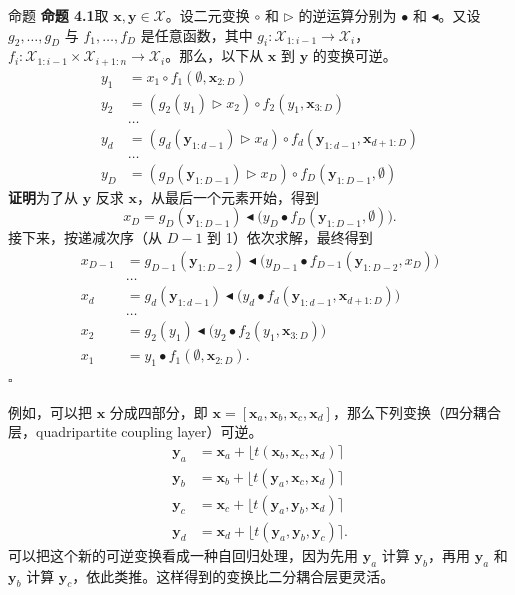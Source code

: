 \begin{booknote}{命题}
\textbf{命题 4.1}\quad 取 $\mathbf{x},\mathbf{y}\in\mathcal{X}$。设二元变换 $\circ$ 和 $\triangleright$ 的逆运算分别为 $\bullet$ 和 $\blacktriangleleft$。又设 $g_2,\ldots,g_D$ 与 $f_1,\ldots,f_D$ 是任意函数，其中 $g_i\colon\mathcal{X}_{1:i-1}\to\mathcal{X}_i$，$f_i\colon\mathcal{X}_{1:i-1}\times\mathcal{X}_{i+1:n}\to\mathcal{X}_i$。那么，以下从 $\mathbf{x}$ 到 $\mathbf{y}$ 的变换可逆。
\begin{align*}
y_1&=x_1\circ f_1(\emptyset,\mathbf{x}_{2:D})\\
y_2&=(g_2(y_1)\mathbin{\triangleright}x_2)\circ f_2(y_1,\mathbf{x}_{3:D})\\
&\ldots\\
y_d&=(g_d(\mathbf{y}_{1:d-1})\mathbin{\triangleright}x_d)
  \circ f_d(\mathbf{y}_{1:d-1},\mathbf{x}_{d+1:D})\\
&\ldots\\
y_D&=(g_D(\mathbf{y}_{1:D-1})\mathbin{\triangleright}x_D)
  \circ f_D(\mathbf{y}_{1:D-1},\emptyset)
\end{align*}
\textbf{证明}\quad 为了从 $\mathbf{y}$ 反求 $\mathbf{x}$，从最后一个元素开始，得到
\[
x_D=g_D(\mathbf{y}_{1:D-1})\mathbin{\blacktriangleleft}
\bigl(y_D\bullet f_D(\mathbf{y}_{1:D-1},\emptyset)\bigr).
\]
接下来，按递减次序（从 $D-1$ 到 1）依次求解，最终得到
\begin{align*}
x_{D-1}&=g_{D-1}(\mathbf{y}_{1:D-2})\mathbin{\blacktriangleleft}
\bigl(y_{D-1}\bullet f_{D-1}(\mathbf{y}_{1:D-2},x_D)\bigr)\\
&\ldots\\
x_d&=g_d(\mathbf{y}_{1:d-1})\mathbin{\blacktriangleleft}
\bigl(y_d\bullet f_d(\mathbf{y}_{1:d-1},\mathbf{x}_{d+1:D})\bigr)\\
&\ldots\\
x_2&=g_2(y_1)\mathbin{\blacktriangleleft}\bigl(y_2\bullet f_2(y_1,\mathbf{x}_{3:D})\bigr)\\
x_1&=y_1\bullet f_1(\emptyset,\mathbf{x}_{2:D}).
\end{align*}
\hfill$\square$
\end{booknote}

例如，可以把 $\mathbf{x}$ 分成四部分，即 $\mathbf{x}=[\mathbf{x}_a,\mathbf{x}_b,\mathbf{x}_c,\mathbf{x}_d]$，那么下列变换（四分耦合层，quadripartite coupling layer）可逆。
\begin{align}
\mathbf{y}_a&=\mathbf{x}_a+\lfloor t(\mathbf{x}_b,\mathbf{x}_c,\mathbf{x}_d)\rceil
\tag{4.37}\label{eq:04-37}\\
\mathbf{y}_b&=\mathbf{x}_b+\lfloor t(\mathbf{y}_a,\mathbf{x}_c,\mathbf{x}_d)\rceil
\tag{4.38}\label{eq:04-38}\\
\mathbf{y}_c&=\mathbf{x}_c+\lfloor t(\mathbf{y}_a,\mathbf{y}_b,\mathbf{x}_d)\rceil
\tag{4.39}\label{eq:04-39}\\
\mathbf{y}_d&=\mathbf{x}_d+\lfloor t(\mathbf{y}_a,\mathbf{y}_b,\mathbf{y}_c)\rceil.
\tag{4.40}\label{eq:04-40}
\end{align}
可以把这个新的可逆变换看成一种自回归处理，因为先用 $\mathbf{y}_a$ 计算 $\mathbf{y}_b$，再用 $\mathbf{y}_a$ 和 $\mathbf{y}_b$ 计算
$\mathbf{y}_c$，依此类推。这样得到的变换比二分耦合层更灵活。


